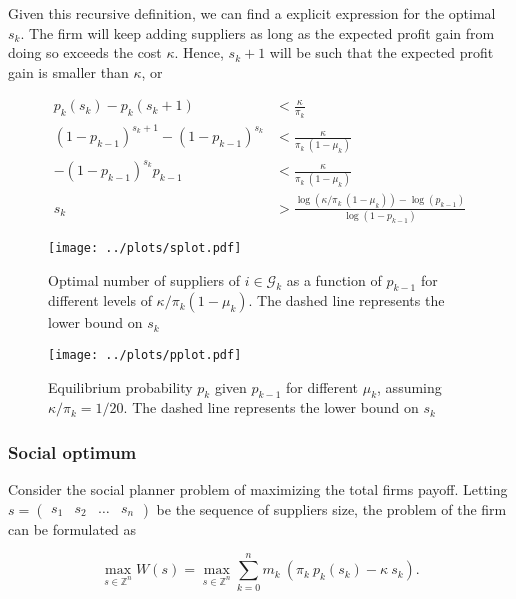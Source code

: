 \documentclass[american, abstract=on]{scrartcl}
\newcommand{\G}{\mathcal{G}}
\begin{document}
Given this recursive definition, we can find a explicit expression for the optimal $s_k$. The firm will keep adding suppliers as long as the expected profit gain from doing so exceeds the cost $\kappa$. Hence, $s_k + 1$ will be such that the expected profit gain is smaller than $\kappa$, or 

\begin{equation}
  \begin{split}
     p_k(s_k) - p_k(s_k + 1) &< \frac{\kappa}{\pi_k} \\
     (1 - p_{k-1})^{s_k + 1} - (1 - p_{k-1})^{s_k} &< \frac{\kappa}{\pi_k \ (1 - \mu_k)} \\
     -(1 - p_{k-1})^{s_k} p_{k-1}&< \frac{\kappa}{\pi_k \ (1 - \mu_k)} \\
     s_k &> \frac{\log(\kappa / \pi_k \ (1 - \mu_k)) - \log(p_{k-1})}{\log(1 - p_{k-1})}
  \end{split}
\end{equation}

\begin{figure}[H]
  \centering
  \texttt{[image: ../plots/splot.pdf]} 
  \caption{Optimal number of suppliers of $i \in \G_k$ as a function of $p_{k - 1}$ for different levels of $\kappa \Big/ \pi_k (1 - \mu_k)$. The dashed line represents the lower bound on $s_k$}
  \label{fig:splot}
\end{figure}

\begin{figure}[H]
  \centering
  \texttt{[image: ../plots/pplot.pdf]} 
  \caption{Equilibrium probability $p_k$ given $p_{k- 1}$ for different $\mu_k$, assuming $\kappa / \pi_k = 1/20$. The dashed line represents the lower bound on $s_k$}
  \label{fig:pplot}
\end{figure}

\subsubsection{Social optimum}

Consider the social planner problem of maximizing the total firms payoff. Letting $s = \begin{pmatrix} s_1 & s_2 & \ldots & s_n \end{pmatrix}$ be the sequence of suppliers size, the problem of the firm can be formulated as

\begin{equation}
  \max_{s \in \mathbb{Z}^n} W(s) = \max_{s \in \mathbb{Z}^n} \sum^n_{k = 0} m_k \ \left(\pi_k \ p_k(s_k) - \kappa \ s_k\right).
\end{equation}
\end{document}
